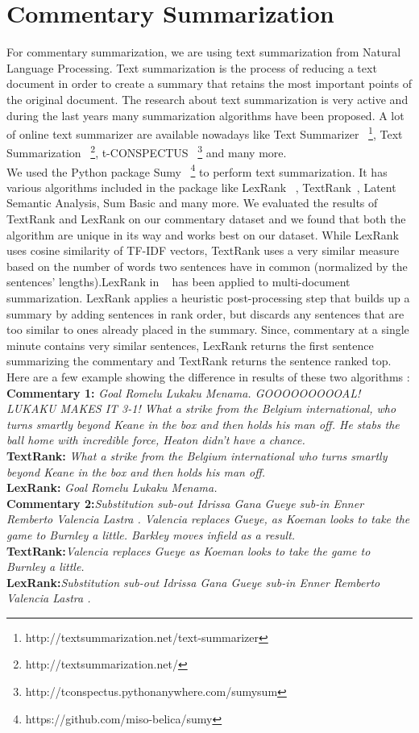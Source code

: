\documentclass[11pt,letterpaper]{article}
\begin{document}
\section{Commentary Summarization}
For commentary summarization, we are using text summarization from Natural Language Processing. Text summarization is the process of reducing a text document in order to create a summary that retains the most important points of the original document. The research about text summarization is very active and during the last years many summarization algorithms have been proposed. A lot of online text summarizer are available nowadays like Text Summarizer ~\footnote{http://textsummarization.net/text-summarizer}, Text Summarization ~\footnote{http://textsummarization.net/}, t-CONSPECTUS ~\footnote{http://tconspectus.pythonanywhere.com/sumysum} and many more. \\
We used the Python package Sumy ~\footnote{https://github.com/miso-belica/sumy} to perform text summarization. It has various algorithms included in the package like LexRank ~\cite{erkan2004lexrank}, TextRank~\cite{mihalcea2004textrank}, Latent Semantic Analysis, Sum Basic and many more. We evaluated the results of TextRank and LexRank on our commentary dataset and we found that both the algorithm are unique in its way and works best on our dataset. While LexRank uses cosine similarity of TF-IDF vectors, TextRank uses a very similar measure based on the number of words two sentences have in common (normalized by the sentences' lengths).LexRank in ~\cite{erkan2004lexrank} has been applied to multi-document summarization. LexRank applies a heuristic post-processing step that builds up a summary by adding sentences in rank order, but discards any sentences that are too similar to ones already placed in the summary. Since, commentary at a single minute contains very similar sentences, LexRank returns the first sentence summarizing the commentary and TextRank returns the sentence ranked top. Here are a few example showing the difference in results of these two algorithms : \\
\textbf{Commentary 1:} \textit{Goal Romelu Lukaku Menama. GOOOOOOOOOAL! LUKAKU MAKES IT 3-1! What a strike from the Belgium international, who turns smartly beyond Keane in the box and then holds his man off. He stabs the ball home with incredible force, Heaton didn't have a chance.}\\
\textbf{TextRank:} \textit{What a strike from the Belgium international who turns smartly beyond Keane in the box and then holds his man off.}\\
\textbf{LexRank:} \textit{Goal Romelu Lukaku Menama.}\\
\textbf{Commentary 2:}\textit{Substitution sub-out Idrissa Gana Gueye sub-in Enner Remberto Valencia Lastra . Valencia replaces Gueye, as Koeman looks to take the game to Burnley a little. Barkley moves infield as a result.}\\
\textbf{TextRank:}\textit{Valencia replaces Gueye as Koeman looks to take the game to Burnley a little.}\\
\textbf{LexRank:}\textit{Substitution sub-out Idrissa Gana Gueye sub-in Enner Remberto Valencia Lastra .}\\
\end{document}
